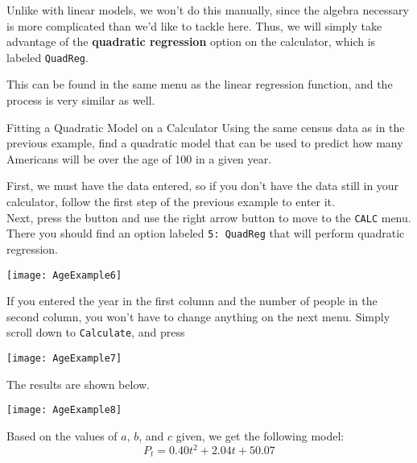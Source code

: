 Unlike with linear models, we won't do this manually, since the algebra necessary is more complicated than we'd like to tackle here.  Thus, we will simply take advantage of the \textbf{quadratic regression} option on the calculator, which is labeled \texttt{QuadReg}.

This can be found in the same menu as the linear regression function, and the process is very similar as well.
\pagebreak

\begin{example}[https://www.youtube.com/watch?v=mFMqHx1lmEE&list=PLfmpjsIzhztutjEb8Pg5OBOlI1p80yVoy&index=6]{Fitting a Quadratic Model on a Calculator}
Using the same census data as in the previous example, find a quadratic model that can be used to predict how many Americans will be over the age of 100 in a given year.

\sol
First, we must have the data entered, so if you don't have the data still in your calculator, follow the first step of the previous example to enter it.\\

Next, press the  button and use the right arrow button to move to the \texttt{CALC} menu.  There you should find an option labeled \texttt{5: QuadReg} that will perform quadratic regression.

\begin{center}
\texttt{[image: AgeExample6]}
\end{center}

If you entered the year in the first column and the number of people in the second column, you won't have to change anything on the next menu.  Simply scroll down to \texttt{Calculate}, and press 

\begin{center}
\texttt{[image: AgeExample7]}
\end{center}

The results are shown below.

\begin{center}
\texttt{[image: AgeExample8]}
\end{center}

Based on the values of $a$, $b$, and $c$ given, we get the following model:
\[\boxed{P_t = 0.40t^2 + 2.04t + 50.07}\]
\end{example}

